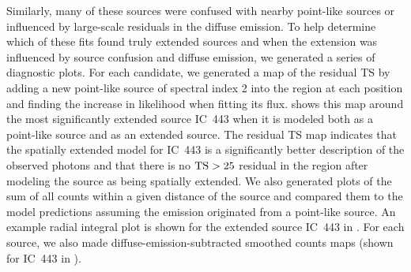 Similarly, many of these sources were confused with nearby
point-like sources or influenced by large-scale residuals in the
diffuse emission.  To help determine which of these fits found
truly extended sources and when the extension was
influenced by source confusion and diffuse emission, we generated a
series of diagnostic plots.  For each candidate, we generated a map
of the residual TS by adding a new point-like source of spectral index 2 into the
region at each position and finding the increase in likelihood when fitting
its flux.  shows this map around the
most significantly extended source IC~443 when it is modeled both as a
point-like source and as an extended source.  The residual TS
map indicates
that the spatially extended model for IC~443 is a significantly better
description of the observed photons and that there is no $\mathrm{TS}>25$
residual in the region after modeling the source as being spatially extended.
We also generated plots of the sum of all counts within a given distance of
the source and compared them to the model predictions assuming the emission
originated from a point-like source.  An example radial integral plot
is shown for the extended source IC~443 in .
For each source, we also made diffuse-emission-subtracted smoothed counts
maps (shown for IC~443 in ).

